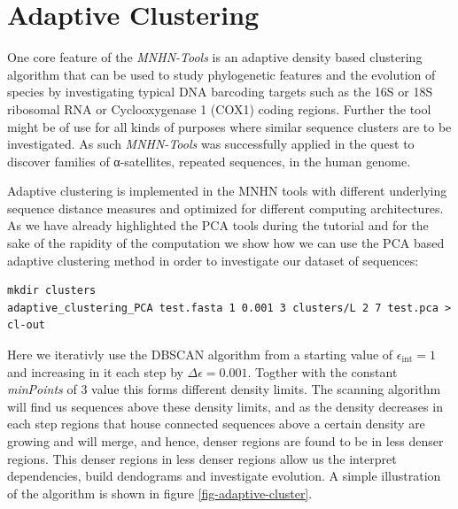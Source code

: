 \section{Adaptive Clustering}

One core feature of the \emph{MNHN-Tools} is an adaptive density
based clustering algorithm that can be used to study phylogenetic
features and the evolution of species by investigating typical
DNA barcoding targets such as the 16S or 18S ribosomal RNA or
Cyclooxygenase 1 (COX1) coding regions. Further the tool might be of
use for all kinds of purposes where similar sequence clusters are to
be investigated. As such \emph{MNHN-Tools}
was successfully applied in the quest to discover families of
α-satellites, repeated sequences, in the human genome.

Adaptive clustering is implemented in the MNHN tools with different underlying
sequence distance measures and optimized for different computing
architectures. As we have already highlighted the PCA tools during the
tutorial and for the sake of the rapidity of the computation we show
how we can use the PCA based adaptive clustering method in order to
investigate our dataset of sequences:
\begin{lstlisting}
mkdir clusters
adaptive_clustering_PCA test.fasta 1 0.001 3 clusters/L 2 7 test.pca > cl-out
\end{lstlisting}
Here we iterativly use the DBSCAN algorithm \cite{dbscan} from a
starting value of $\epsilon_{\mathrm{int}} = 1$ and increasing in it
each step by $\Delta\epsilon = 0.001$. Togther with the constant
\emph{minPoints} of 3 value this forms different density limits. The
scanning algorithm will find us sequences above these density limits,
and as the density decreases in each step regions that house connected
sequences above a certain density are growing and will merge, and
hence, denser regions are found to be in less denser regions. This
denser regions in less denser regions allow us the interpret
dependencies, build dendograms and investigate evolution. A simple
illustration of the algorithm is shown in figure
\ref{fig-adaptive-cluster}.
